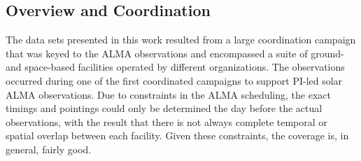 \documentclass[twocolumn]{aastex62}
\begin{document}
\subsection{Overview and Coordination}
The data sets presented in this work resulted from a large coordination campaign that was keyed to the ALMA observations and encompassed a suite of ground- and space-based facilities operated by different organizations.
The observations occurred during one of the first coordinated campaigns to support PI-led solar ALMA observations. Due to constraints in the ALMA scheduling, the exact timings and pointings could only be determined the day before the actual observations, with the result that there is not always complete temporal or spatial overlap between each facility.  
Given these constraints, the coverage is, in general, fairly good.
\end{document}
